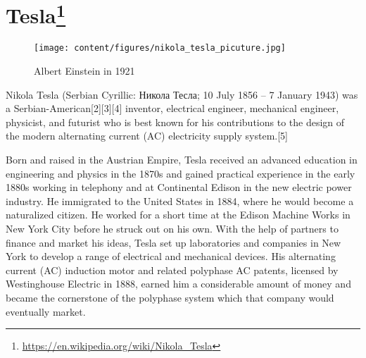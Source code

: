 \section*{Tesla\protect\footnote{\url{https://en.wikipedia.org/wiki/Nikola_Tesla}}}

\begin{figure}[ht]
  \centering
  \texttt{[image: content/figures/nikola\_tesla\_picuture.jpg]}
  \caption{Albert Einstein in 1921\protect\footnotemark}
\end{figure}

Nikola Tesla (Serbian Cyrillic: Никола Тесла; 10 July 1856 – 7 January 1943) was a Serbian-American[2][3][4] inventor, electrical engineer, mechanical engineer, physicist, and futurist who is best known for his contributions to the design of the modern alternating current (AC) electricity supply system.[5]

Born and raised in the Austrian Empire, Tesla received an advanced education in engineering and physics in the 1870s and gained practical experience in the early 1880s working in telephony and at Continental Edison in the new electric power industry. He immigrated to the United States in 1884, where he would become a naturalized citizen. He worked for a short time at the Edison Machine Works in New York City before he struck out on his own. With the help of partners to finance and market his ideas, Tesla set up laboratories and companies in New York to develop a range of electrical and mechanical devices. His alternating current (AC) induction motor and related polyphase AC patents, licensed by Westinghouse Electric in 1888, earned him a considerable amount of money and became the cornerstone of the polyphase system which that company would eventually market.